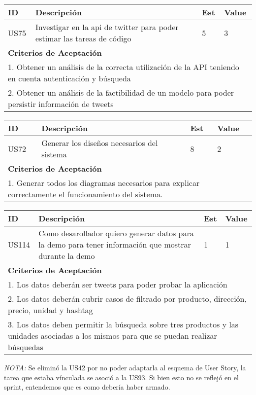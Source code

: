 \bigskip
\begin{tabular}{|p{1cm}|p{10cm}|p{1cm}|p{1cm}|}
\hline
\hline
\textbf{ID}&\textbf{Descripción}&\textbf{Est}&\textbf{Value}\\
\hline
\hline
US75&Investigar en la api de twitter para poder estimar las tareas de código&5&3\\
\hline
\hline
\multicolumn{4}{|p{13cm}|}{ \textbf{Criterios de Aceptación}} \\
\hline
\hline
\multicolumn{4}{|p{13cm}|}{1. Obtener un análisis de la correcta utilización de la API teniendo en cuenta autenticación y búsqueda}\\
\multicolumn{4}{|p{13cm}|}{2. Obtener un análisis de la factibilidad de un modelo para poder persistir información de tweets}\\
\hline
\hline
\end{tabular}

\bigskip
\begin{tabular}{|p{1cm}|p{10cm}|p{1cm}|p{1cm}|}
\hline
\hline
\textbf{ID}&\textbf{Descripción}&\textbf{Est}&\textbf{Value}\\
\hline
\hline
US72&Generar los diseños necesarios del sistema&8&2\\
\hline
\hline
\multicolumn{4}{|p{13cm}|}{ \textbf{Criterios de Aceptación}} \\
\hline
\hline
\multicolumn{4}{|p{13cm}|}{1. Generar todos los diagramas necesarios para explicar correctamente el funcionamiento del sistema.}\\
\hline
\hline
\end{tabular}


\bigskip
\begin{tabular}{|p{1cm}|p{10cm}|p{1cm}|p{1cm}|}
\hline
\hline
\textbf{ID}&\textbf{Descripción}&\textbf{Est}&\textbf{Value}\\
\hline
\hline
US114&Como desarollador quiero generar datos para la demo para tener información que mostrar durante la demo&1&1\\
\hline
\hline
\multicolumn{4}{|p{13cm}|}{ \textbf{Criterios de Aceptación}} \\
\hline
\hline
\multicolumn{4}{|p{13cm}|}{1. Los datos deberán ser tweets para poder probar la aplicación}\\
\multicolumn{4}{|p{13cm}|}{2. Los datos deberán cubrir casos de filtrado por producto, dirección, precio, unidad y hashtag}\\
\multicolumn{4}{|p{13cm}|}{3. Los datos deben permitir la búsqueda sobre tres productos y las unidades asociadas a los mismos para que se puedan realizar búsquedas}\\
\hline
\hline
\end{tabular}

\emph{NOTA:} Se eliminó la US42 por no poder adaptarla al esquema de User Story, la tarea que estaba vínculada se asoció a la US93. Si bien esto no se reflejó en el sprint, entendemos que es como debería haber armado.
